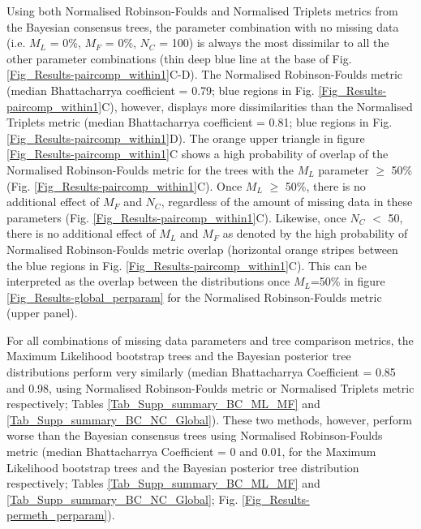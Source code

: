 Using both Normalised Robinson-Foulds and Normalised Triplets metrics from the Bayesian consensus trees, the parameter combination with no missing data (i.e. $M_{L}$ = 0\%, $M_{F}$ = 0\%, $N_{C}$ = 100) is always the most dissimilar to all the other parameter combinations (thin deep blue line at the base of Fig. \ref{Fig_Results-paircomp_within1}C-D).
The Normalised Robinson-Foulds metric (median Bhattacharrya coefficient = 0.79; blue regions in Fig. \ref{Fig_Results-paircomp_within1}C), however, displays more dissimilarities than the Normalised Triplets metric (median Bhattacharrya coefficient = 0.81; blue regions in Fig. \ref{Fig_Results-paircomp_within1}D).
The orange upper triangle in figure \ref{Fig_Results-paircomp_within1}C shows a high probability of overlap of the Normalised Robinson-Foulds metric for the trees with the $M_{L}$ parameter $\geq$ 50\% (Fig. \ref{Fig_Results-paircomp_within1}C).
Once $M_{L}$ $\geq$ 50\%, there is no additional effect of $M_{F}$ and $N_{C}$, regardless of the amount of missing data in these parameters (Fig. \ref{Fig_Results-paircomp_within1}C).
Likewise, once $N_{C}$ $<$ 50, there is no additional effect of $M_{L}$ and $M_{F}$ as denoted by the high probability of Normalised Robinson-Foulds metric overlap (horizontal orange stripes between the blue regions in Fig. \ref{Fig_Results-paircomp_within1}C).
This can be interpreted as the overlap between the distributions once $M_L$=50\% in figure \ref{Fig_Results-global_perparam} for the Normalised Robinson-Foulds metric (upper panel).

For all combinations of missing data parameters and tree comparison metrics, the Maximum Likelihood bootstrap trees and the Bayesian posterior tree distributions perform very similarly (median Bhattacharrya Coefficient = 0.85 and 0.98, using Normalised Robinson-Foulds metric or Normalised Triplets metric respectively; Tables \ref{Tab_Supp_summary_BC_ML_MF} and \ref{Tab_Supp_summary_BC_NC_Global}).
These two methods, however, perform worse than the Bayesian consensus trees using Normalised Robinson-Foulds metric (median Bhattacharrya Coefficient = 0 and 0.01, for the Maximum Likelihood bootstrap trees and the Bayesian posterior tree distribution respectively; Tables \ref{Tab_Supp_summary_BC_ML_MF} and \ref{Tab_Supp_summary_BC_NC_Global}; Fig. \ref{Fig_Results-permeth_perparam}).

